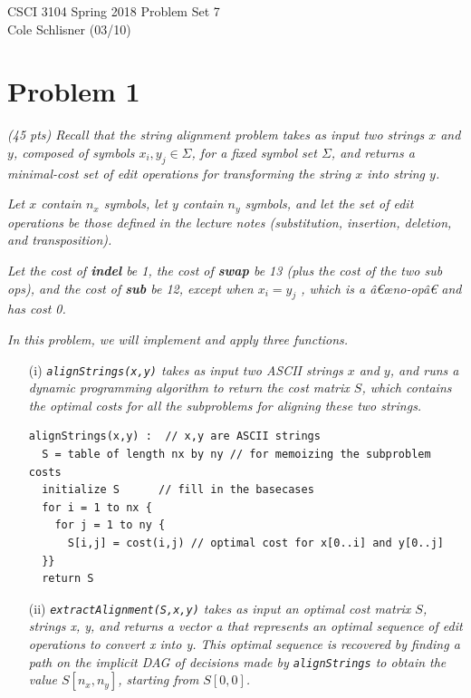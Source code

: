 \documentclass[11pt]{article} \setlength{\oddsidemargin}{0in}
\begin{document}
\noindent CSCI 3104 Spring 2018 \hfill Problem Set 7\\
Cole Schlisner (03/10)

\hrulefill

{\selectfont

  \section*{Problem 1}

  \textit{(45 pts) Recall that the string alignment problem takes as
    input two strings $x$ and $y$, composed of symbols
    $x_i , y_j \in \Sigma$, for a fixed symbol set $\Sigma$, and returns a
    minimal-cost set of edit operations for transforming the string
    $x$ into string $y$.}

  \textit{Let $x$ contain $n_x$ symbols, let $y$ contain $n_y$
    symbols, and let the set of edit operations be those defined in
    the lecture notes (substitution, insertion, deletion, and
    transposition).}

  \textit{Let the cost of \textbf{indel} be 1, the cost of
    \textbf{swap} be 13 (plus the cost of the two sub ops), and the
    cost of \textbf{sub} be 12, except when $x_i = y_j$ , which is a
    â€œno-opâ€ and has cost 0.}

  \textit{In this problem, we will implement and apply three
    functions.}

  \begin{enumerate}
  \item[(i)] \textit{ \texttt{alignStrings(x,y)} takes as input two
      ASCII strings $x$ and $y$, and runs a dynamic programming
      algorithm to return the cost matrix $S$, which contains the
      optimal costs for all the subproblems for aligning these two
      strings.  }

\begin{verbatim}
alignStrings(x,y) :  // x,y are ASCII strings
  S = table of length nx by ny // for memoizing the subproblem costs
  initialize S      // fill in the basecases
  for i = 1 to nx {
    for j = 1 to ny {
      S[i,j] = cost(i,j) // optimal cost for x[0..i] and y[0..j]
  }}
  return S
\end{verbatim}

  \item[(ii)] \textit{\texttt{extractAlignment(S,x,y)} takes as input
      an optimal cost matrix $S$, strings x, y, and returns a vector a
      that represents an optimal sequence of edit operations to
      convert x into y. This optimal sequence is recovered by finding
      a path on the implicit DAG of decisions made by
      \texttt{alignStrings} to obtain the value $S[n_x , n_y]$,
      starting from $S[0, 0]$.}


\end{enumerate}}
\end{document}
